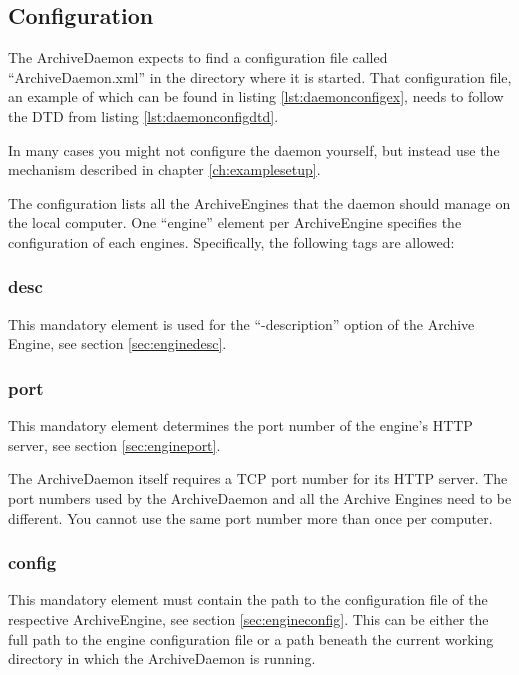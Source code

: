 \subsection{Configuration}
The ArchiveDaemon expects to find a configuration file called
``ArchiveDaemon.xml'' in the directory where it is started.  That
configuration file, an example of which can be found in listing
\ref{lst:daemonconfigex}, needs to follow the DTD from listing
\ref{lst:daemonconfigdtd}.

In many cases you might not configure the daemon yourself,
but instead use the mechanism described in chapter \ref{ch:examplesetup}.





\noindent The configuration lists all the
ArchiveEngines that the daemon should manage on the local
computer. One ``engine'' element per ArchiveEngine specifies the
configuration of each engines. Specifically, the following tags are
allowed:

\subsubsection{desc}
This mandatory element is used for the ``-description'' option of the
Archive Engine, see section \ref{sec:enginedesc}.

\subsubsection{port}
This mandatory element determines the port number of the engine's HTTP
server, see section \ref{sec:engineport}.

\NOTE The ArchiveDaemon itself requires a TCP port number for its HTTP
server. The port numbers used by the ArchiveDaemon and all the Archive
Engines need to be different. You cannot use the same port number more
than once per computer.

\subsubsection{config}
This mandatory element must contain the path to the configuration
file of the respective ArchiveEngine, see section \ref{sec:engineconfig}.
This can be either the full path to the engine configuration file or a path
beneath the current working directory in which the ArchiveDaemon is running.

